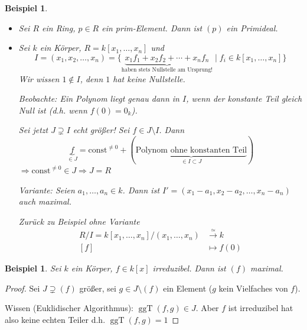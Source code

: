 \documentclass[a4paper,12pt,numbers=noenddot,parskip=full]{scrartcl}
\theoremstyle{dotless}
\newtheorem{example}[theorem]{Beispiel}
\theoremstyle{remark}
\begin{document}
	\begin{example}
		\begin{itemize}
			\item Sei $R$ ein Ring, $p \in R$ ein prim-Element. Dann ist $(p)$ ein Primideal.
			\item Sei $k$ ein Körper, $R = k[x_1, \dots, x_n]$ und
			\begin{equation*}
				I = (x_1, x_2, \dots, x_n)= \{ \underbrace{x_1 f_1 + x_2 f_2 + \cdots + x_n f_n}_\text{haben stets Nullstelle am Ursprung!} \mid f_i \in k[x_1, \dots, x_n] \}
			\end{equation*}
			Wir wissen $1 \notin I$, denn $1$ hat keine Nullstelle.
			
			Beobachte: Ein Polynom liegt genau dann in $I$, wenn der konstante Teil gleich Null ist (d.h. wenn $f(0) = 0_k$).
			
			Sei jetzt $J \supsetneq I$ echt größer! Sei $f \in J \setminus I$. Dann
			\begin{equation*}
				\underbrace{f}_{\in J} = \text{const}^{\neq 0} + (\underbrace{\text{Polynom ohne konstanten Teil}}_{\in I \subset J})
			\end{equation*}
			$\Rightarrow \text{const}^{\neq 0} \in J \Rightarrow J = R$
			
			Variante: Seien $a_1, \dots, a_n \in k$. Dann ist $I' = (x_1 - a_1, x_2 - a_2, \dots, x_n - a_n)$ auch maximal.
			
			Zurück zu Beispiel ohne Variante
			\begin{align*}
				R/I = k[x_1, \dots, x_n]/(x_1, \dots, x_n) &\overset{\simeq}{\longrightarrow} k \\
				[f] &\longmapsto f(0)
			\end{align*}
		\end{itemize}
	\end{example}

	\begin{example}
		Sei $k$ ein Körper, $f \in k[x]$ irreduzibel. Dann ist $(f)$ maximal.
	\end{example}

	\begin{proof}
		Sei $J \supsetneq (f)$ größer, sei $g \in J \setminus (f)$ ein Element ($g$ kein Vielfaches von $f$).
		
		Wissen (Euklidischer Algorithmus): $\operatorname{ggT}(f,g) \in J$. Aber $f$ ist irreduzibel hat also keine echten Teiler d.h. $\operatorname{ggT}(f,g) = 1$
	\end{proof}
\end{document}
